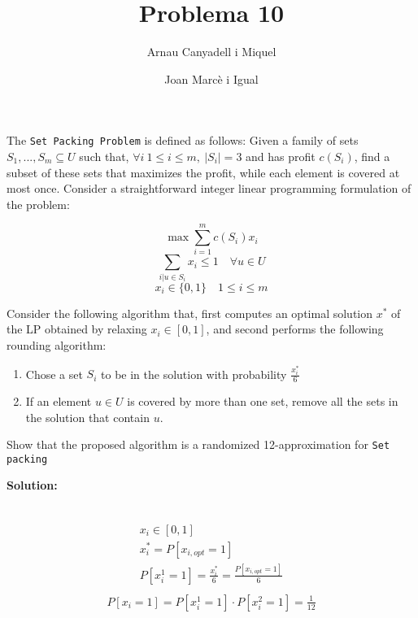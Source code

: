 \documentclass[a4paper]{article}
\title{Problema 10}
\author{Arnau Canyadell i Miquel \and Joan Marcè i Igual}
\date{}
\begin{document}
\maketitle

The \texttt{Set Packing Problem} is defined as follows: Given a family of sets $S_1,...,S_m \subseteq U$ such that, $\forall i \ 1 \le i \le m,\ |S_i|=3$ and has profit $c(S_i)$, find a subset of these sets that maximizes the profit, while each element is covered at most once. Consider a straightforward integer linear programming formulation of the problem:

$$
\max \sum_{i=1}^m c(S_i)x_i
$$
$$
\sum_{i|u\in S_i} x_i \le 1 \quad \forall u \in U
$$
$$
x_i \in \{0, 1\} \quad 1 \le i \le m
$$

Consider the following algorithm that, first computes an optimal solution $x^*$ of the LP obtained by relaxing $x_i \in [0, 1]$, and second performs the following rounding algorithm:
\begin{enumerate}
	\item Chose a set $S_i$ to be in the solution with probability $\frac{x_i^*}{6}$
	\item If an element $u\in U$ is covered by more than one set, remove all the sets in the solution that contain $u$.
\end{enumerate}

Show that the proposed algorithm is a randomized 12-approximation for \texttt{Set packing}

\textbf{Solution:}

\begin{gather*}
	
\end{gather*}

\begin{gather*}
	x_i \in [0,1] \\
	x_i^* = P[x_{i,opt} = 1] \\
	P[x_i^1 = 1] = \frac{x_i^*}{6} = \frac{P[x_{i,opt} = 1]}{6} \\
\end{gather*}
\begin{gather*}
	P[x_i = 1] = P[x_i^1 = 1] \cdot P[x_i^2 = 1] = \frac{1}{12}
\end{gather*}
\end{document}
